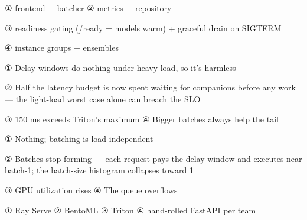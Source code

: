 
\begin{tbboptions}
  \item ① frontend + batcher        ② metrics + repository
  \item ③ readiness gating (/ready = models warm) + graceful drain on SIGTERM
  \item ④ instance groups + ensembles
\end{tbboptions}


\begin{tbboptions}
  \item ① Delay windows do nothing under heavy load, so it's harmless
  \item ② Half the latency budget is now spent waiting for companions before any work — the light-load worst case alone can breach the SLO
  \item ③ 150 ms exceeds Triton's maximum        ④ Bigger batches always help the tail
\end{tbboptions}


\begin{tbboptions}
  \item ① Nothing; batching is load-independent
  \item ② Batches stop forming — each request pays the delay window and executes near batch-1; the batch-size histogram collapses toward 1
  \item ③ GPU utilization rises        ④ The queue overflows
\end{tbboptions}


\begin{tbboptions}
  \item ① Ray Serve        ② BentoML        ③ Triton        ④ hand-rolled FastAPI per team
\end{tbboptions}

